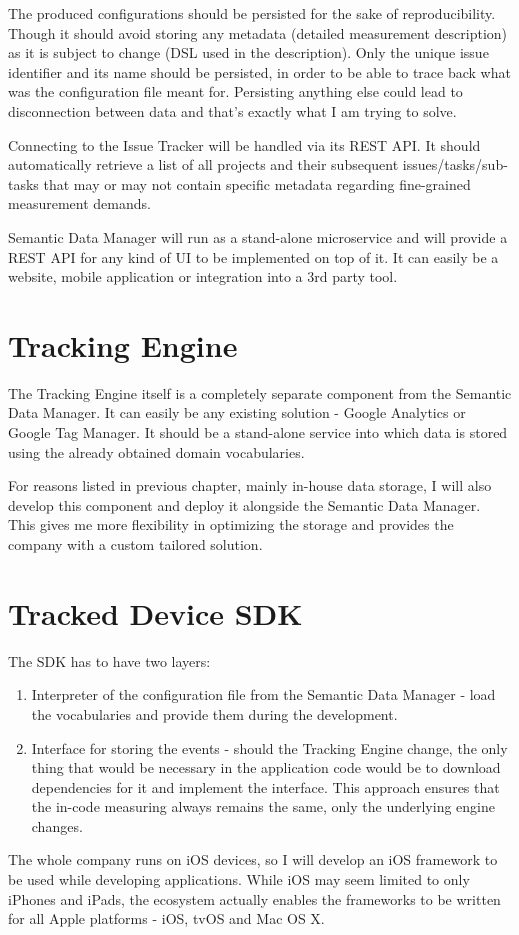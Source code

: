 The produced configurations should be persisted for the sake of reproducibility. Though it should avoid storing any metadata (detailed measurement description) as it is subject to change (DSL used in the description). Only the unique issue identifier and its name should be persisted, in order to be able to trace back what was the configuration file meant for. Persisting anything else could lead to disconnection between data and that's exactly what I am trying to solve.

Connecting to the Issue Tracker will be handled via its REST API. It should automatically retrieve a list of all projects and their subsequent issues/tasks/sub-tasks that may or may not contain specific metadata regarding fine-grained measurement demands.

Semantic Data Manager will run as a stand-alone microservice and will provide a REST API for any kind of UI to be implemented on top of it. It can easily be a website, mobile application or integration into a 3rd party tool.

\section{Tracking Engine}

The Tracking Engine itself is a completely separate component from the Semantic Data Manager. It can easily be any existing solution - Google Analytics or Google Tag Manager. It should be a stand-alone service into which data is stored using the already obtained domain vocabularies.

For reasons listed in previous chapter, mainly in-house data storage, I will also develop this component and deploy it alongside the Semantic Data Manager. This gives me more flexibility in optimizing the storage and provides the company with a custom tailored solution.

\section{Tracked Device SDK}

The SDK has to have two layers:

\begin{enumerate}
	\item Interpreter of the configuration file from the Semantic Data Manager - load the vocabularies and provide them during the development.
	\item Interface for storing the events - should the Tracking Engine change, the only thing that would be necessary in the application code would be to download dependencies for it and implement the interface. This approach ensures that the in-code measuring always remains the same, only the underlying engine changes.
\end{enumerate}

The whole company runs on iOS devices, so I will develop an iOS framework to be used while developing applications. While iOS may seem limited to only iPhones and iPads, the ecosystem actually enables the frameworks to be written for all Apple platforms - iOS, tvOS and Mac OS X.
